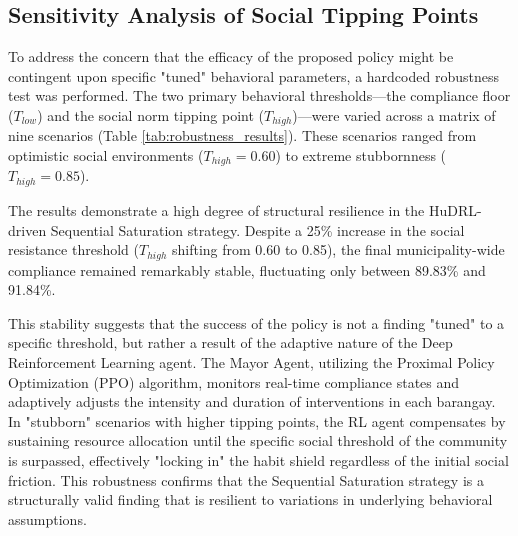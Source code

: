 \subsection{Sensitivity Analysis of Social Tipping Points}
To address the concern that the efficacy of the proposed policy might be contingent upon specific "tuned" behavioral parameters, a hardcoded robustness test was performed. The two primary behavioral thresholds—the compliance floor (\(T_{low}\)) and the social norm tipping point (\(T_{high}\))—were varied across a matrix of nine scenarios (Table \ref{tab:robustness_results}). These scenarios ranged from optimistic social environments (\(T_{high} = 0.60\)) to extreme stubbornness (\(T_{high} = 0.85\)).

The results demonstrate a high degree of structural resilience in the HuDRL-driven Sequential Saturation strategy. Despite a 25\% increase in the social resistance threshold (\(T_{high}\) shifting from 0.60 to 0.85), the final municipality-wide compliance remained remarkably stable, fluctuating only between 89.83\% and 91.84\%.

This stability suggests that the success of the policy is not a finding "tuned" to a specific threshold, but rather a result of the adaptive nature of the Deep Reinforcement Learning agent. The Mayor Agent, utilizing the Proximal Policy Optimization (PPO) algorithm, monitors real-time compliance states and adaptively adjusts the intensity and duration of interventions in each barangay. In "stubborn" scenarios with higher tipping points, the RL agent compensates by sustaining resource allocation until the specific social threshold of the community is surpassed, effectively "locking in" the habit shield regardless of the initial social friction. This robustness confirms that the Sequential Saturation strategy is a structurally valid finding that is resilient to variations in underlying behavioral assumptions.

